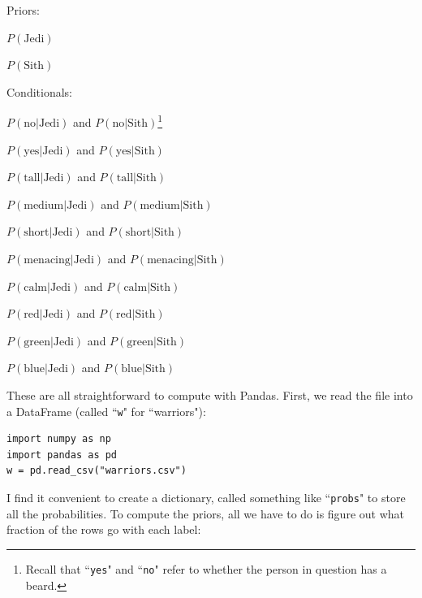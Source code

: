 \documentclass[12pt]{article}
\begin{document}
\vspace{.1in}
\begin{compactitem}
\item Priors:
    \begin{compactitem}
    \item $P(\textrm{Jedi})$
    \item $P(\textrm{Sith})$
    \end{compactitem}

\item Conditionals:
    \begin{compactitem}
    \item $P(\textrm{no}|\textrm{Jedi})$ and
$P(\textrm{no}|\textrm{Sith})$\footnote{Recall that ``\texttt{yes}" and
``\texttt{no}" refer to whether the person in question has a beard.}
    \item $P(\textrm{yes}|\textrm{Jedi})$ and $P(\textrm{yes}|\textrm{Sith})$
    \item $P(\textrm{tall}|\textrm{Jedi})$ and $P(\textrm{tall}|\textrm{Sith})$
    \item $P(\textrm{medium}|\textrm{Jedi})$ and $P(\textrm{medium}|\textrm{Sith})$
    \item $P(\textrm{short}|\textrm{Jedi})$ and $P(\textrm{short}|\textrm{Sith})$
    \item $P(\textrm{menacing}|\textrm{Jedi})$ and $P(\textrm{menacing}|\textrm{Sith})$
    \item $P(\textrm{calm}|\textrm{Jedi})$ and $P(\textrm{calm}|\textrm{Sith})$
    \item $P(\textrm{red}|\textrm{Jedi})$ and $P(\textrm{red}|\textrm{Sith})$
    \item $P(\textrm{green}|\textrm{Jedi})$ and $P(\textrm{green}|\textrm{Sith})$
    \item $P(\textrm{blue}|\textrm{Jedi})$ and $P(\textrm{blue}|\textrm{Sith})$
    \end{compactitem}

\end{compactitem}

These are all straightforward to compute with Pandas. First, we read the file
into a DataFrame (called ``\texttt{w}" for ``warriors"):

\begin{Verbatim}[fontsize=\small,samepage=true,frame=none]
import numpy as np
import pandas as pd
w = pd.read_csv("warriors.csv")
\end{Verbatim}

I find it convenient to create a dictionary, called something like
``\texttt{probs}" to store all the probabilities. To compute the priors, all
we have to do is figure out what fraction of the rows go with each label:
\end{document}
